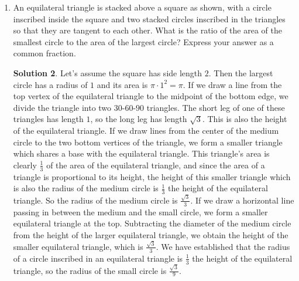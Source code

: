 \documentclass{article}
\theoremstyle{definition}
\newtheorem*{solution}{Solution}
\begin{document}
\begin{multicols}{2}
\begin{enumerate}
\begin{solution}
            \end{solution}
        \item An equilateral triangle is stacked above a square as shown, with a circle inscribed inside the square and two stacked circles inscribed in the triangles so that they are tangent to each other.
            What is the ratio of the area of the smallest circle to the area of the largest circle?
            Express your answer as a common fraction.
            \begin{center}
            \end{center}
            \begin{solution}
                Let's assume the square has side length $2$.
                Then the largest circle has a radius of $1$ and its area is $\pi \cdot 1^2 = \pi$.
                If we draw a line from the top vertex of the equilateral triangle to the midpoint of the bottom edge, we divide the triangle into two $30$-$60$-$90$ triangles.
                The short leg of one of these triangles has length $1$, so the long leg has length $\sqrt{3}$.
                This is also the height of the equilateral triangle.
                If we draw lines from the center of the medium circle to the two bottom vertices of the triangle, we form a smaller triangle which shares a base with the equilateral triangle.
                This triangle's area is clearly $\frac{1}{3}$ of the area of the equilateral triangle, and since the area of a triangle is proportional to its height, the height of this smaller triangle which is also the radius of the medium circle is $\frac{1}{3}$ the height of the equilateral triangle.
                So the radius of the medium circle is $\frac{\sqrt{3}}{3}$.
                If we draw a horizontal line passing in between the medium and the small circle, we form a smaller equilateral triangle at the top.
                Subtracting the diameter of the medium circle from the height of the larger equilateral triangle, we obtain the height of the smaller equilateral triangle, which is $\frac{\sqrt{3}}{3}$.
                We have established that the radius of a circle inscribed in an equilateral triangle is $\frac{1}{3}$ the height of the equilateral triangle, so the radius of the small circle is $\frac{\sqrt{3}}{9}$.

\end{solution}
\end{enumerate}
\end{multicols}
\end{document}
